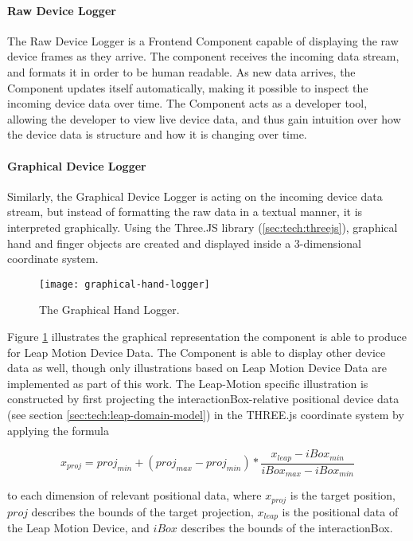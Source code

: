 \paragraph*{Raw Device Logger}

The Raw Device Logger is a Frontend Component capable of displaying the raw device frames as they arrive. The component receives the incoming data stream, and formats it in order to be human readable. As new data arrives, the Component updates itself automatically, making it possible to inspect the incoming device data over time. The Component acts as a developer tool, allowing the developer to view live device data, and thus gain intuition over how the device data is structure and how it is changing over time.

\paragraph*{Graphical Device Logger}

Similarly, the Graphical Device Logger is acting on the incoming device data stream, but instead of formatting the raw data in a textual manner, it is interpreted graphically. Using the Three.JS library (\ref{sec:tech:threejs}), graphical hand and finger objects are created and displayed inside a 3-dimensional coordinate system.

\begin{figure}[ht]
    \centering
    \texttt{[image: graphical-hand-logger]}
    \caption{The Graphical Hand Logger.}
    \label{fig:graphical-hand-logger}
\end{figure}

Figure \ref{fig:graphical-hand-logger} illustrates the graphical representation the component is able to produce for Leap Motion Device Data. The Component is able to display other device data as well, though only illustrations based on Leap Motion Device Data are implemented as part of this work. The Leap-Motion specific illustration is constructed by first projecting the interactionBox-relative positional device data (see section \ref{sec:tech:leap-domain-model}) in the THREE.js coordinate system by applying the formula

\begin{equation}
x_{proj} = proj_{min} + (proj_{max} - proj_{min}) * \dfrac{x_{leap} - iBox_{min}}{iBox_{max} - iBox_{min}}    
\end{equation}

to each dimension of relevant positional data, where $x_{proj}$ is the target position, $proj$ describes the bounds of the target projection, $x_{leap}$ is the positional data of the Leap Motion Device, and $iBox$ describes the bounds of the interactionBox. 

